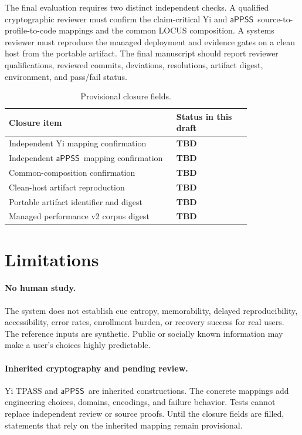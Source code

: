 \documentclass[sigconf,anonymous]{acmart}
\newcommand{\APPSS}{\ensuremath{\mathsf{aPPSS}}}
\newcommand{\TBD}{\textbf{TBD}}
\begin{document}
The final evaluation requires two distinct independent checks. A qualified
cryptographic reviewer must confirm the claim-critical Yi and \APPSS\
source-to-profile-to-code mappings and the common LOCUS composition. A systems
reviewer must reproduce the managed deployment and evidence gates on a clean
host from the portable artifact. The final manuscript should report reviewer
qualifications, reviewed commits, deviations, resolutions, artifact digest,
environment, and pass/fail status.

\begin{table}[t]
\centering
\caption{Provisional closure fields.}
\label{tab:closure}
\footnotesize
\begin{tabular}{p{0.57\linewidth}p{0.25\linewidth}}
\toprule
\textbf{Closure item} & \textbf{Status in this draft} \\
\midrule
Independent Yi mapping confirmation & \TBD \\
Independent \APPSS\ mapping confirmation & \TBD \\
Common-composition confirmation & \TBD \\
Clean-host artifact reproduction & \TBD \\
Portable artifact identifier and digest & \TBD \\
Managed performance v2 corpus digest & \TBD \\
\bottomrule
\end{tabular}
\end{table}

\section{Limitations}
\label{sec:limitations}

\paragraph{No human study.}
The system does not establish cue entropy, memorability, delayed
reproducibility, accessibility, error rates, enrollment burden, or recovery
success for real users. The reference inputs are synthetic. Public or socially
known information may make a user's choices highly predictable.

\paragraph{Inherited cryptography and pending review.}
Yi TPASS and \APPSS\ are inherited constructions. The concrete mappings add
engineering choices, domains, encodings, and failure behavior. Tests cannot
replace independent review or source proofs. Until the closure fields are
filled, statements that rely on the inherited mapping remain provisional.
\end{document}
